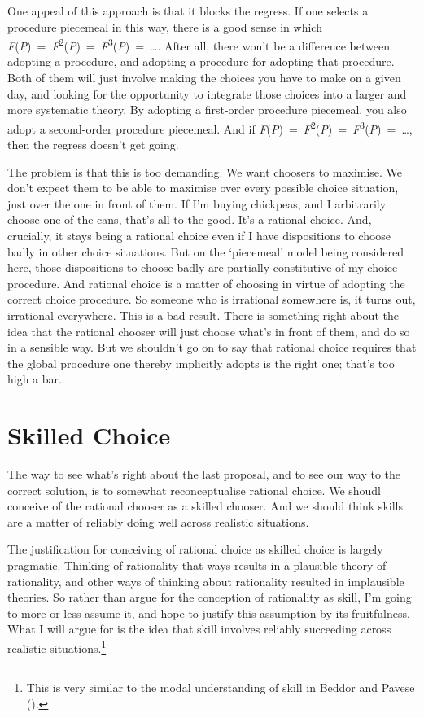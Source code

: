 \documentclass[
  10pt,
  letterpaper,
  DIV=11,
  numbers=noendperiod,
  twoside]{scrartcl}
\begin{document}
One appeal of this approach is that it blocks the regress. If one
selects a procedure piecemeal in this way, there is a good sense in
which
\emph{F}(\emph{P})~=~\emph{F}\textsuperscript{2}(\emph{P})~=~\emph{F}\textsuperscript{3}(\emph{P})~=~\ldots.
After all, there won't be a difference between adopting a procedure, and
adopting a procedure for adopting that procedure. Both of them will just
involve making the choices you have to make on a given day, and looking
for the opportunity to integrate those choices into a larger and more
systematic theory. By adopting a first-order procedure piecemeal, you
also adopt a second-order procedure piecemeal. And if
\emph{F}(\emph{P})~=~\emph{F}\textsuperscript{2}(\emph{P})~=~\emph{F}\textsuperscript{3}(\emph{P})~=~\ldots,
then the regress doesn't get going.

The problem is that this is too demanding. We want choosers to maximise.
We don't expect them to be able to maximise over every possible choice
situation, just over the one in front of them. If I'm buying chickpeas,
and I arbitrarily choose one of the cans, that's all to the good. It's a
rational choice. And, crucially, it stays being a rational choice even
if I have dispositions to choose badly in other choice situations. But
on the `piecemeal' model being considered here, those dispositions to
choose badly are partially constitutive of my choice procedure. And
rational choice is a matter of choosing in virtue of adopting the
correct choice procedure. So someone who is irrational somewhere is, it
turns out, irrational everywhere. This is a bad result. There is
something right about the idea that the rational chooser will just
choose what's in front of them, and do so in a sensible way. But we
shouldn't go on to say that rational choice requires that the global
procedure one thereby implicitly adopts is the right one; that's too
high a bar.

\section{Skilled Choice}\label{skilled-choice}

The way to see what's right about the last proposal, and to see our way
to the correct solution, is to somewhat reconceptualise rational choice.
We shoudl conceive of the rational chooser as a skilled chooser. And we
should think skills are a matter of reliably doing well across realistic
situations.

The justification for conceiving of rational choice as skilled choice is
largely pragmatic. Thinking of rationality that ways results in a
plausible theory of rationality, and other ways of thinking about
rationality resulted in implausible theories. So rather than argue for
the conception of rationality as skill, I'm going to more or less assume
it, and hope to justify this assumption by its fruitfulness. What I will
argue for is the idea that skill involves reliably succeeding across
realistic situations.\footnote{This is very similar to the modal
  understanding of skill in Beddor and Pavese
  ().}
\end{document}
